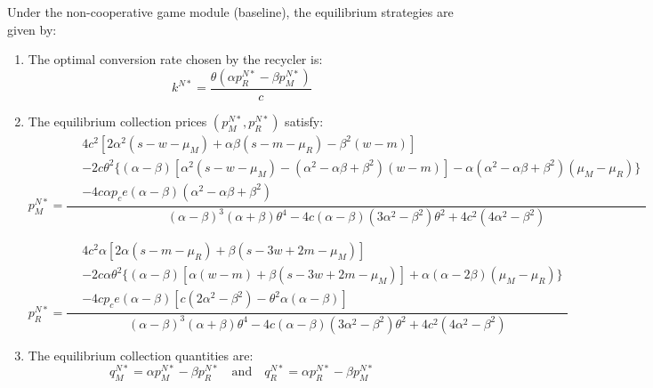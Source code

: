 \documentclass[authoryear,preprint,review,times,10pt]{elsarticle}
\begin{document}
\begin{prop}
\label{prop:baseline}
Under the non-cooperative game module (baseline), the equilibrium strategies are given by:
\begin{enumerate}[label={(\arabic*)}]
\item The optimal conversion rate chosen by the recycler is:
\begin{equation}
k^{N*} = \frac{\theta(\alpha p_R^{N*} - \beta p_M^{N*})}{c}
\label{eq:k_N_star}
\end{equation}

\item The equilibrium collection prices $(p_M^{N*}, p_R^{N*})$ satisfy:
\begin{equation}
p_M^{N*} = \frac{
\displaystyle
\begin{aligned}
& 4c^2 \left[ 2\alpha^2(s - w - \mu_M) + \alpha\beta(s - m - \mu_R) - \beta^2(w - m) \right] \\
& - 2c\theta^2 \Big\{ (\alpha-\beta) \left[ \alpha^2(s - w - \mu_M) - (\alpha^2 - \alpha\beta + \beta^2)(w - m) \right] - \alpha(\alpha^2 - \alpha\beta + \beta^2)(\mu_M - \mu_R) \Big\} \\
& - 4c\alpha p_c e (\alpha - \beta)(\alpha^2 - \alpha\beta + \beta^2)
\end{aligned}
}{
\displaystyle (\alpha-\beta)^3(\alpha+\beta)\theta^4 - 4c(\alpha-\beta)(3\alpha^2-\beta^2)\theta^2 + 4c^2(4\alpha^2-\beta^2)
}
\label{eq:p_MN_star}
\end{equation}

\begin{equation}
p_R^{N*} = \frac{
\displaystyle
\begin{aligned}
& 4c^2\alpha \left[ 2\alpha(s - m - \mu_R) + \beta(s - 3w + 2m - \mu_M) \right] \\
& - 2c\alpha\theta^2 \Big\{ (\alpha-\beta) \left[ \alpha(w - m) + \beta(s - 3w + 2m - \mu_M) \right] + \alpha(\alpha - 2\beta)(\mu_M - \mu_R) \Big\} \\
& - 4c p_c e (\alpha - \beta) \left[ c(2\alpha^2 - \beta^2) - \theta^2\alpha(\alpha - \beta) \right]
\end{aligned}
}{
\displaystyle (\alpha-\beta)^3(\alpha+\beta)\theta^4 - 4c(\alpha-\beta)(3\alpha^2-\beta^2)\theta^2 + 4c^2(4\alpha^2-\beta^2)
}
\label{eq:p_RN_star}
\end{equation}

\item The equilibrium collection quantities are:
\begin{equation}
q_M^{N*} = \alpha p_M^{N*} - \beta p_R^{N*}
\quad \text{and} \quad
q_R^{N*} = \alpha p_R^{N*} - \beta p_M^{N*}
\label{eq:q_N_star}
\end{equation}


\end{enumerate}
\end{prop}
\end{document}
